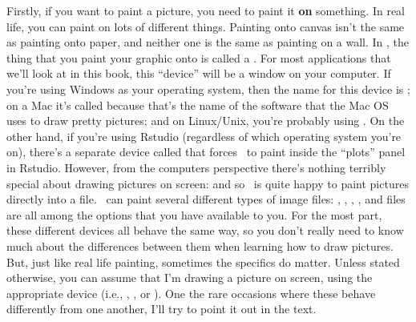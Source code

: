 Firstly, if you want to paint a picture, you need to paint it {\bf on} something. In real life, you can paint on lots of different things. Painting onto canvas isn't the same as painting onto paper, and neither one is the same as painting on a wall. In \R, the thing that you paint your graphic onto is called a . For most applications that we'll look at in this book, this ``device'' will be a window on your computer. If you're using Windows as your operating system, then the name for this device is ; on a Mac it's called  because that's the name of the software that the Mac OS uses to draw pretty pictures; and on Linux/Unix, you're probably using . On the other hand, if you're using Rstudio (regardless of which operating system you're on), there's a separate device called  that forces \R\ to paint inside the ``plots'' panel in Rstudio. However, from the computers perspective there's nothing terribly special about drawing pictures on screen: and so \R\ is quite happy to paint pictures directly into a file. \R\ can paint several different types of image files: , , , ,  and  files are all among the options that you have available to you. For the most part, these different devices all behave the same way, so you don't really need to know much about the differences between them when learning how to draw pictures. But, just like real life painting, sometimes the specifics do matter. Unless stated otherwise, you can assume that I'm drawing a picture on screen, using the appropriate device (i.e., , ,  or ). One the rare occasions where these behave differently from one another, I'll try to point it out in the text. 

